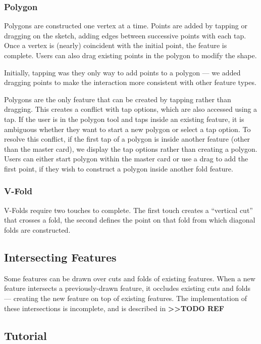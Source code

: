 \subsubsection{Polygon}\label{polygon}

Polygons are constructed one vertex at a time. Points are added by
tapping or dragging on the sketch, adding edges between successive
points with each tap. Once a vertex is (nearly) coincident with the
initial point, the feature is complete. Users can also drag existing
points in the polygon to modify the shape.

Initially, tapping was they only way to add points to a polygon --- we
added dragging points to make the interaction more consistent with other
feature types.

Polygons are the only feature that can be created by tapping rather than
dragging. This creates a conflict with tap options, which are also
accessed using a tap. If the user is in the polygon tool and taps inside
an existing feature, it is ambiguous whether they want to start a new
polygon or select a tap option. To resolve this conflict, if the first
tap of a polygon is inside another feature (other than the master card),
we display the tap options rather than creating a polygon. Users can
either start polygon within the master card or use a drag to add the
first point, if they wish to construct a polygon inside another fold
feature.

\subsubsection{V-Fold}\label{v-fold}

V-Folds require two touches to complete. The first touch creates a
``vertical cut'' that crosses a fold, the second defines the point on
that fold from which diagonal folds are constructed.

\subsection{Intersecting Features}\label{intersecting-features}

Some features can be drawn over cuts and folds of existing features.
When a new feature intersects a previously-drawn feature, it occludes
existing cuts and folds --- creating the new feature on top of existing
features. The implementation of these intersections is incomplete, and
is described in \textbf{\textgreater{}\textgreater{}TODO REF}

\subsection{Tutorial}\label{tutorial}


